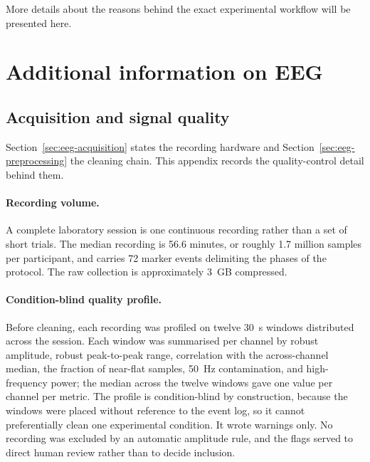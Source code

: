 \documentclass[english]{article}
\begin{document}
More details about the reasons behind the exact experimental workflow will be presented here.

\section{Additional information on EEG}
\label{sec:app-eeg}

\subsection{Acquisition and signal quality}
\label{sec:app-eeg-device}

Section~\ref{sec:eeg-acquisition} states the recording hardware and Section~\ref{sec:eeg-preprocessing} the cleaning chain. This appendix records the quality-control detail behind them.

\paragraph{Recording volume.}
A complete laboratory session is one continuous recording rather than a set of short trials. The median recording is 56.6 minutes, or roughly 1.7 million samples per participant, and carries 72 marker events delimiting the phases of the protocol. The raw collection is approximately 3~GB compressed.

\paragraph{Condition-blind quality profile.}
Before cleaning, each recording was profiled on twelve 30~s windows distributed across the session. Each window was summarised per channel by robust amplitude, robust peak-to-peak range, correlation with the across-channel median, the fraction of near-flat samples, 50~Hz contamination, and high-frequency power; the median across the twelve windows gave one value per channel per metric. The profile is condition-blind by construction, because the windows were placed without reference to the event log, so it cannot preferentially clean one experimental condition. It wrote warnings only. No recording was excluded by an automatic amplitude rule, and the flags served to direct human review rather than to decide inclusion.
\end{document}
